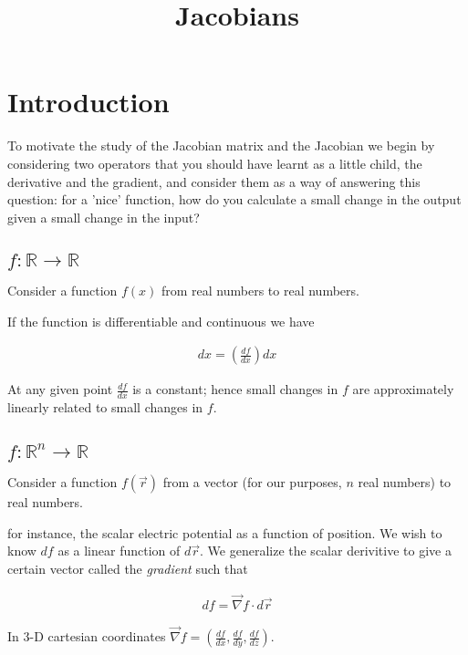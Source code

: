 \documentclass{article}
\title{Jacobians}
\date{}
\begin{document}
\maketitle

\section{Introduction}

To motivate the study of the Jacobian matrix and the Jacobian we begin by considering two operators that you should have learnt as a little child, the derivative and the gradient, and consider them as a way of answering this question: for a 'nice' function, how do you calculate a small change in the output given a small change in the input?

\subsection{$f: \mathbb{R} \rightarrow \mathbb{R}$}

Consider a function $f(x)$ from real numbers to real numbers.

If the function is differentiable and continuous we have 

\begin{align}
dx = (\frac{df}{dx}) dx
\end{align}

At any given point $\frac{df}{dx}$ is a constant; hence small changes in $f$ are approximately linearly related to small changes in $f$.

\subsection{$f: \mathbb{R}^n \rightarrow \mathbb{R}$}

Consider a function $f(\vec{r})$ from a vector (for our purposes, $n$ real numbers) to real numbers.

for instance, the scalar electric potential as a function of position. We wish to know $df$ as a linear function of $d\vec{r}$. We generalize the scalar derivitive to give a certain vector called the \emph{gradient} such that 

\begin{align}
df = \vec\nabla f \cdot d\vec{r}
\end{align}

In 3-D cartesian coordinates $\vec\nabla f = (\frac{df}{dx}, \frac{df}{dy}, \frac{df}{dz})$.
\end{document}
